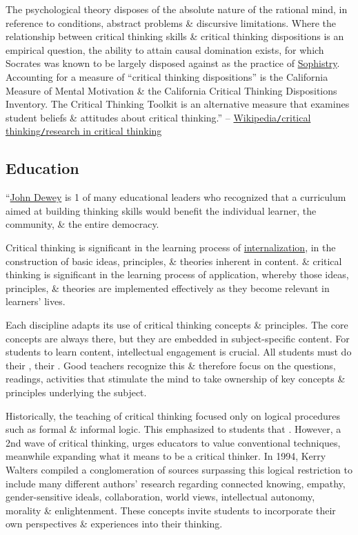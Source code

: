 \documentclass[oneside]{book}
\numberwithin{equation}{section}
\begin{document}
The psychological theory disposes of the absolute nature of the rational mind, in reference to conditions, abstract problems \& discursive limitations. Where the relationship between critical thinking skills \& critical thinking dispositions is an empirical question, the ability to attain causal domination exists, for which Socrates was known to be largely disposed against as the practice of \href{https://en.wikipedia.org/wiki/Sophist}{Sophistry}. Accounting for a measure of ``critical thinking dispositions'' is the California Measure of Mental Motivation \& the California Critical Thinking Dispositions Inventory. The Critical Thinking Toolkit is an alternative measure that examines student beliefs \& attitudes about critical thinking.'' -- \href{https://en.wikipedia.org/wiki/Critical_thinking#Research_in_critical_thinking}{Wikipedia\texttt{/}critical thinking\texttt{/}research in critical thinking}

\subsection{Education}
``\href{https://en.wikipedia.org/wiki/John_Dewey}{John Dewey} is 1 of many educational leaders who recognized that a curriculum aimed at building thinking skills would benefit the individual learner, the community, \& the entire democracy.

Critical thinking is significant in the learning process of \href{https://en.wikipedia.org/wiki/Internalization}{internalization}, in the construction of basic ideas, principles, \& theories inherent in content. \& critical thinking is significant in the learning process of application, whereby those ideas, principles, \& theories are implemented effectively as they become relevant in learners' lives.

Each discipline adapts its use of critical thinking concepts \& principles. The core concepts are always there, but they are embedded in subject-specific content. For students to learn content, intellectual engagement is crucial. All students must do their , their . Good teachers recognize this \& therefore focus on the questions, readings, activities that stimulate the mind to take ownership of key concepts \& principles underlying the subject.

Historically, the teaching of critical thinking focused only on logical procedures such as formal \& informal logic. This emphasized to students that . However, a 2nd wave of critical thinking, urges educators to value conventional techniques, meanwhile expanding what it means to be a critical thinker. In 1994, Kerry Walters compiled a conglomeration of sources surpassing this logical restriction to include many different authors' research regarding connected knowing, empathy, gender-sensitive ideals, collaboration, world views, intellectual autonomy, morality \& enlightenment. These concepts invite students to incorporate their own perspectives \& experiences into their thinking.
\end{document}
